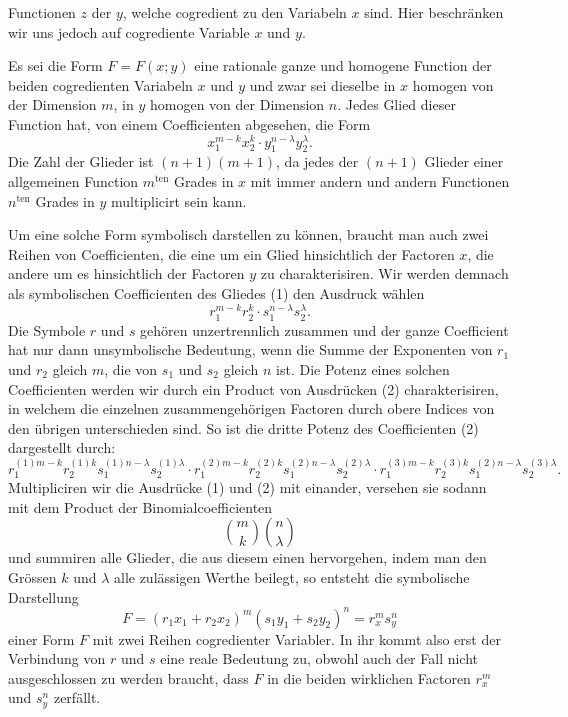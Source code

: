 \documentclass[11pt]{article}
\providecommand{\weberpage}[1]{}
\providecommand{\weq}[2]{\begin{equation}\tag{#1}#2\end{equation}}
\begin{document}
\weberpage{79}
Functionen $z$ der $y$, welche cogredient zu den Variabeln $x$ sind. Hier beschränken wir uns jedoch auf cogrediente Variable $x$ und $y$.

Es sei die Form $F=F(x;y)$ eine rationale ganze und homogene Function der beiden cogredienten Variabeln $x$ und $y$ und zwar sei dieselbe in $x$ homogen von der Dimension $m$, in $y$ homogen von der Dimension $n$. Jedes Glied dieser Function hat, von einem Coefficienten abgesehen, die Form
\weq{1}{x_1^{m-k}x_2^k\cdot y_1^{n-\lambda}y_2^\lambda.}
Die Zahl der Glieder ist $(n+1)(m+1)$, da jedes der $(n+1)$ Glieder einer allgemeinen Function $m^{\text{ten}}$ Grades in $x$ mit immer andern und andern Functionen $n^{\text{ten}}$ Grades in $y$ multiplicirt sein kann.

Um eine solche Form symbolisch darstellen zu können, braucht man auch zwei Reihen von Coefficienten, die eine um ein Glied hinsichtlich der Factoren $x$, die andere um es hinsichtlich der Factoren $y$ zu charakterisiren. Wir werden demnach als symbolischen Coefficienten des Gliedes (1) den Ausdruck wählen
\weq{2}{r_1^{m-k}r_2^k\cdot s_1^{n-\lambda}s_2^\lambda.}
Die Symbole $r$ und $s$ gehören unzertrennlich zusammen und der ganze Coefficient hat nur dann unsymbolische Bedeutung, wenn die Summe der Exponenten von $r_1$ und $r_2$ gleich $m$, die von $s_1$ und $s_2$ gleich $n$ ist. Die Potenz eines solchen Coefficienten werden wir durch ein Product von Ausdrücken (2) charakterisiren, in welchem die einzelnen zusammengehörigen Factoren durch obere Indices von den übrigen unterschieden sind. So ist die dritte Potenz des Coefficienten (2) dargestellt durch:
\[
r_1^{(1)m-k}r_2^{(1)k}s_1^{(1)n-\lambda}s_2^{(1)\lambda}\cdot r_1^{(2)m-k}r_2^{(2)k}s_1^{(2)n-\lambda}s_2^{(2)\lambda}\cdot r_1^{(3)m-k}r_2^{(3)k}s_1^{(2)n-\lambda}s_2^{(3)\lambda}.
\]
Multipliciren wir die Ausdrücke (1) und (2) mit einander, versehen sie sodann mit dem Product der Binomialcoefficienten
\weq{3}{\binom{m}{k}\binom{n}{\lambda}}
und summiren alle Glieder, die aus diesem einen hervorgehen, indem man den Grössen $k$ und $\lambda$ alle zulässigen Werthe beilegt, so entsteht die symbolische Darstellung
\[
F=(r_1x_1+r_2x_2)^m(s_1y_1+s_2y_2)^n=r_x^m s_y^n
\]
einer Form $F$ mit zwei Reihen cogredienter Variabler. In ihr kommt also erst der Verbindung von $r$ und $s$ eine reale Bedeutung zu, obwohl auch der Fall nicht ausgeschlossen zu werden braucht, dass $F$ in die beiden wirklichen Factoren $r_x^m$ und $s_y^n$ zerfällt.
\end{document}
